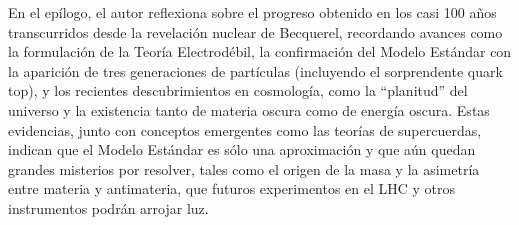 \documentclass[12pt]{article}
\begin{document}
En el epílogo, el autor reflexiona sobre el progreso obtenido en los casi 100 años transcurridos desde la revelación nuclear de Becquerel, recordando avances como la formulación de la Teoría Electrodébil, la confirmación del Modelo Estándar con la aparición de tres generaciones de partículas (incluyendo el sorprendente quark top), y los recientes descubrimientos en cosmología, como la “planitud” del universo y la existencia tanto de materia oscura como de energía oscura. Estas evidencias, junto con conceptos emergentes como las teorías de supercuerdas, indican que el Modelo Estándar es sólo una aproximación y que aún quedan grandes misterios por resolver, tales como el origen de la masa y la asimetría entre materia y antimateria, que futuros experimentos en el LHC y otros instrumentos podrán arrojar luz.
\end{document}
